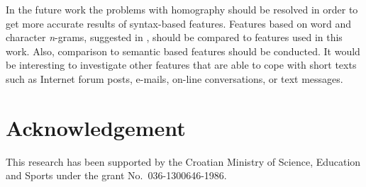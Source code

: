 \documentclass{llncs}
\begin{document}
In the future work the problems with homography should be resolved in order to
get more accurate results of syntax-based features. Features based on word and
character \emph{n}-grams, suggested in
\cite{coyotl2006authorship,keselj2003n,peng2003language}, should be compared to
features used in this work. Also, comparison to semantic based features
should be conducted. It would be interesting to investigate other features
that are able to cope with short texts such as Internet forum posts, e-mails,
on-line conversations, or text messages.


\section*{Acknowledgement}
This research has been supported by the Croatian Ministry of Science, Education
and Sports under the grant No.~036-1300646-1986.



\end{document}
